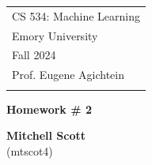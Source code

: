 \documentclass[a4paper,12pt]{article}
\theoremstyle{definition}
\theoremstyle{remark}
\begin{document}
	
	
	
	
	
	\thispagestyle{empty} %
	
	\begin{tabular}{p{15.5cm}} %
		{\large \sc CS 534:  Machine Learning} \\
		Emory University \\ Fall 2024 \\ Prof. Eugene Agichtein \\
		\hline %
		\\
	\end{tabular} %
	
	\vspace*{0.3cm} %
	
	\begin{center} %
		{\Large \bf Homework \# 2} %
		\vspace{2mm}
		
		{\bf Mitchell Scott}\\ (mtscot4) %
		
	\end{center}  
	
	\vspace{0.4cm}
	
	
	
\end{document}
